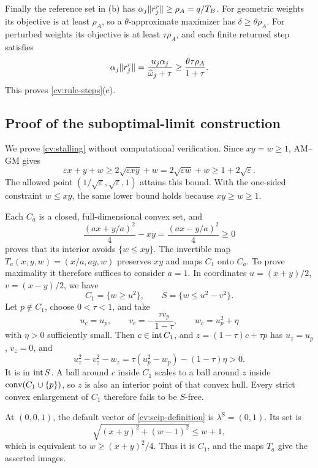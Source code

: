 Finally the reference set in (b) has
$\alpha_j\lVert r_j^r\rVert\ge\rho_A=q/T_B$. For geometric weights its
objective is at least $\rho_A$, so a $\theta$-approximate maximizer has
$\delta\ge\theta\rho_A$. For perturbed weights its objective is at least
$\tau\rho_A$, and each finite returned step satisfies
\[
 \alpha_j\lVert r_j^r\rVert
   =\frac{u_j\alpha_j}{\widehat\omega_j+\tau}
   \ge\frac{\theta\tau\rho_A}{1+\tau}.
\]
This proves \cref{cv:rule-steps}(c).

\subsection{Proof of the suboptimal-limit construction}\label{cv:stalling-proof}

We prove \cref{cv:stalling} without computational verification. Since
$xy=w\ge1$, AM--GM gives
\[
 \varepsilon x+y+w
 \ge2\sqrt{\varepsilon xy}+w
 =2\sqrt{\varepsilon w}+w\ge1+2\sqrt\varepsilon.
\]
The allowed point $(1/\sqrt\varepsilon,\sqrt\varepsilon,1)$ attains this
bound. With the one-sided constraint $w\le xy$, the same lower bound
holds because $xy\ge w\ge1$.

Each $C_a$ is a closed, full-dimensional convex set, and
\[
 \frac{(ax+y/a)^2}{4}-xy=\frac{(ax-y/a)^2}{4}\ge0
\]
proves that its interior avoids $\{w\le xy\}$. The invertible map
$T_a(x,y,w)=(x/a,ay,w)$ preserves $xy$ and maps $C_1$ onto $C_a$.
To prove maximality it therefore suffices to consider $a=1$. In coordinates
$u=(x+y)/2$, $v=(x-y)/2$, we have
\[
 C_1=\{w\ge u^2\},\qquad S=\{w\le u^2-v^2\}.
\]
Let $p\notin C_1$, choose $0<\tau<1$, and take
\[
 u_c=u_p,\qquad v_c=-\frac{\tau v_p}{1-\tau},\qquad
 w_c=u_p^2+\eta
\]
with $\eta>0$ sufficiently small. Then $c\in\operatorname{int} C_1$, and
$z=(1-\tau)c+\tau p$ has $u_z=u_p$, $v_z=0$, and
\[
 u_z^2-v_z^2-w_z
   =\tau(u_p^2-w_p)-(1-\tau)\eta>0.
\]
It is in $\operatorname{int} S$. A ball around $c$ inside $C_1$ scales to a ball
around $z$ inside $\operatorname{conv}(C_1\cup\{p\})$, so $z$ is also an interior
point of that convex hull. Every strict convex enlargement of $C_1$
therefore fails to be $S$-free.

At $(0,0,1)$, the default vector of \cref{cv:scip-definition} is
$\lambda^{\mathrm S}=(0,1)$. Its set is
\[
 \sqrt{(x+y)^2+(w-1)^2}\le w+1,
\]
which is equivalent to $w\ge(x+y)^2/4$. Thus it is $C_1$, and the maps
$T_a$ give the asserted images.

